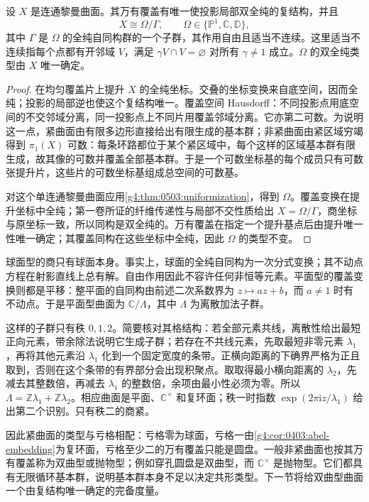 \begin{theorem}
	\label{g4:thm:0503:quotient}
	设 \(X\) 是连通黎曼曲面。其万有覆盖有唯一使投影局部双全纯的复结构，并且
	\[
		X\cong\Omega/\Gamma,\qquad
		\Omega\in\{\mathbb P^1,\mathbb C,\mathbb D\},
	\]
	其中 \(\Gamma\) 是 \(\Omega\) 的全纯自同构群的一个子群，其作用自由且适当不连续。这里适当不连续指每个点都有开邻域 \(V\)，满足 \(\gamma V\cap V=\varnothing\) 对所有 \(\gamma\ne1\) 成立。\(\Omega\) 的双全纯类型由 \(X\) 唯一确定。
\end{theorem}
\begin{proof}
	在均匀覆盖片上提升 \(X\) 的全纯坐标。交叠的坐标变换来自底空间，因而全纯；投影的局部逆也使这个复结构唯一。覆盖空间 Hausdorff：不同投影点用底空间的不交邻域分离，同一投影点上不同片用覆盖邻域分离。它亦第二可数。为说明这一点，紧曲面由有限多边形直接给出有限生成的基本群；非紧曲面由紧区域穷竭得到 \(\pi_1(X)\) 可数：每条环路都位于某个紧区域中，每个这样的区域基本群有限生成，故其像的可数并覆盖全部基本群。于是一个可数坐标基的每个成员只有可数张提升片，这些片的可数坐标基组成总空间的可数基。

	对这个单连通黎曼曲面应用\cref{g4:thm:0503:uniformization}，得到 \(\Omega\)。覆盖变换在提升坐标中全纯；第一卷所证的纤维传递性与局部不交性质给出 \(X=\Omega/\Gamma\)，商坐标与原坐标一致，所以同构是双全纯的。万有覆盖在指定一个提升基点后由提升唯一性唯一确定；其覆盖同构在这些坐标中全纯，因此 \(\Omega\) 的类型不变。
\end{proof}

球面型的商只有球面本身。事实上，球面的全纯自同构为一次分式变换；其不动点方程在射影直线上总有解。自由作用因此不容许任何非恒等元素。平面型的覆盖变换则都是平移：整平面的自同构由前述二次系数界为 \(z\mapsto az+b\)，而 \(a\ne1\) 时有不动点。于是平面型曲面为 \(\mathbb C/\Lambda\)，其中 \(\Lambda\) 为离散加法子群。

\ProseParagraphBreak

这样的子群只有秩 \(0,1,2\)。简要核对其格结构：若全部元素共线，离散性给出最短正向元素，带余除法说明它生成子群；若存在不共线元素，先取最短非零元素 \(\lambda_1\)，再将其他元素沿 \(\lambda_1\) 化到一个固定宽度的条带。正横向距离的下确界严格为正且取到，否则在这个条带的有界部分会出现积聚点。取取得最小横向距离的 \(\lambda_2\)，先减去其整数倍，再减去 \(\lambda_1\) 的整数倍，余项由最小性必须为零。所以 \(\Lambda=\mathbb Z\lambda_1+\mathbb Z\lambda_2\)。相应曲面是平面、\(\mathbb C^\times\) 和复环面；秩一时指数 \(\exp(2\pi\mathrm{i}z/\lambda_1)\) 给出第二个识别。只有秩二的商紧。

\ProseParagraphBreak

因此紧曲面的类型与亏格相配：亏格零为球面，亏格一由\cref{g4:cor:0403:abel-embedding}为复环面，亏格至少二的万有覆盖只能是圆盘。一般非紧曲面也按其万有覆盖称为双曲型或抛物型；例如穿孔圆盘是双曲型，而 \(\mathbb C^\times\) 是抛物型。它们都具有无限循环基本群，说明基本群本身不足以决定共形类型。下一节将给双曲型曲面一个由复结构唯一确定的完备度量。
